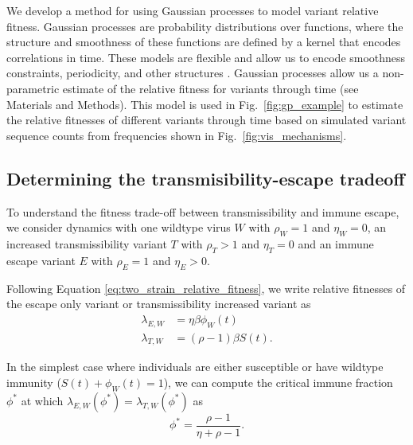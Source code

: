 \documentclass[11pt,oneside,letterpaper]{article}
\newcommand{\wt}{W}
\newcommand{\varE}{E}
\newcommand{\varT}{T}
\newcommand{\varEscape}{\eta}
\newcommand{\varTransmission}{\rho}
\begin{document}
We develop a method for using Gaussian processes to model variant relative fitness.
Gaussian processes are probability distributions over functions, where the structure and smoothness of these functions are defined by a kernel that encodes correlations in time.
These models are flexible and allow us to encode smoothness constraints, periodicity, and other structures \cite{Gortler2019a}.
Gaussian processes allow us a non-parametric estimate of the relative fitness for variants through time (see Materials and Methods).
This model is used in Fig.~\ref{fig:gp_example} to estimate the relative fitnesses of different variants through time based on simulated variant sequence counts from frequencies shown in Fig.~\ref{fig:vis_mechanisms}.

\subsection*{Determining the transmisibility-escape tradeoff}

To understand the fitness trade-off between transmissibility and immune escape, we consider dynamics with one wildtype virus $\wt$ with $\varTransmission_\wt = 1$ and $\varEscape_\wt = 0$, an increased transmissibility variant $\varT$ with $\varTransmission_\varT > 1$ and $\varEscape_\varT = 0$ and an immune escape variant $\varE$ with $\varTransmission_\varE = 1$ and $\varEscape_\varE > 0$.

Following Equation \ref{eq:two_strain_relative_fitness}, we write relative fitnesses of the escape only variant or transmissibility increased variant as
\begin{align*}
    \lambda_{\varE, \wt} &= \varEscape \beta \phi_{\wt}(t)\\
    \lambda_{\varT, \wt} &= (\varTransmission - 1) \beta S(t).
\end{align*}

In the simplest case where individuals are either susceptible or have wildtype immunity ($S(t) + \phi_{\wt}(t) = 1$), we can compute the critical immune fraction $\phi^{*}$ at which $\lambda_{\varE, \wt}(\phi^{*}) = \lambda_{\varT, \wt}(\phi^{*})$ as
\begin{equation} \label{eq:critical_immunity}
    \phi^{*} = \frac{\varTransmission - 1}{\varEscape + \varTransmission - 1}.
\end{equation}
\end{document}
